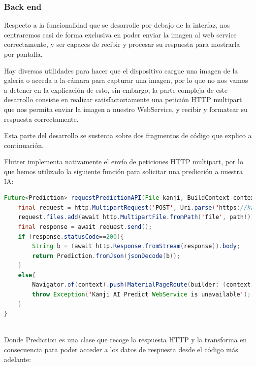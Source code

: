 \documentclass{article}
\begin{document}
\subsubsection{Back end}
Respecto a la funcionalidad que se desarrolle por debajo de la interfaz, nos centraremos casi de forma exclusiva en poder enviar la imagen al web service correctamente, y ser capaces de recibir y procesar su respuesta para mostrarla por pantalla.

Hay diversas utilidades para hacer que el dispositivo cargue una imagen de la galería o acceda a la cámara para capturar una imagen, por lo que no nos vamos a detener en la explicación de esto, sin embargo, la parte compleja de este desarrollo consiste en realizar satisfactoriamente una petición HTTP multipart que nos permita enviar la imagen a nuestro WebService, y recibir y formatear su respuesta correctamente.

Esta parte del desarrollo se sustenta sobre dos fragmentos de código que explico a continuación.

Flutter implementa nativamente el envío de peticiones HTTP multipart, por lo que hemos utilizado la siguiente función para solicitar una predicción a nuestra IA:

\noindent\begin{minipage}{\textwidth}
\begin{lstlisting}[language=java]
Future<Prediction> requestPredictionAPI(File kanji, BuildContext context) async{
	final request = http.MultipartRequest('POST', Uri.parse('https://kanji.otterleek.com/'));
	request.files.add(await http.MultipartFile.fromPath('file', path!));
	final response = await request.send();
	if (response.statusCode==200){
    	String b = (await http.Response.fromStream(response)).body;
    	return Prediction.fromJson(jsonDecode(b));
	}
	else{
    	Navigator.of(context).push(MaterialPageRoute(builder: (context) => Unavailable()));
    	throw Exception('Kanji AI Predict WebService is unavailable');
	}
}
\end{lstlisting}
\end{minipage}\\

Donde Prediction es una clase que recoge la respuesta HTTP y la transforma en consecuencia para poder acceder a los datos de respuesta desde el código más adelante:
\end{document}
